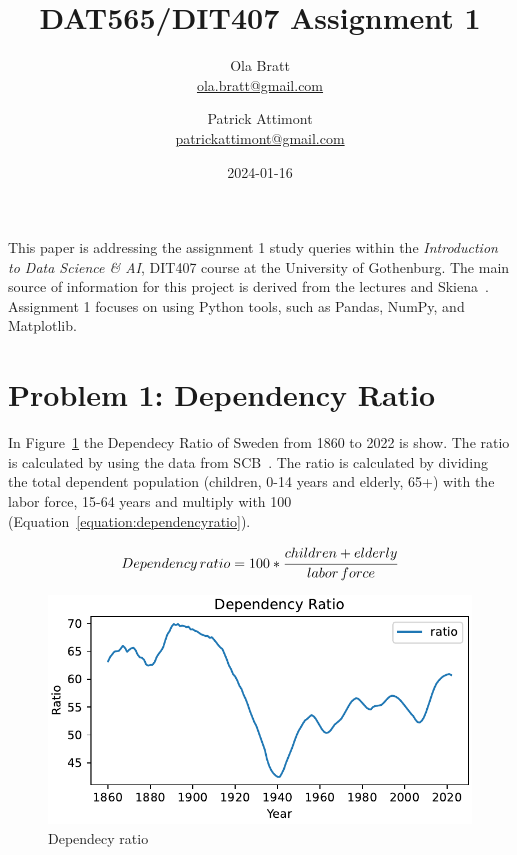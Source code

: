 \documentclass[a4paper]{article}
\begin{document}
\author{Ola Bratt \\
  \href{mailto:ola.bratt@gmail.com}{ola.bratt@gmail.com}
  \and
  Patrick Attimont \\
  \href{patrickattimont@gmail.com}{patrickattimont@gmail.com}
}

\title{DAT565/DIT407 Assignment 1}
\date{2024-01-16}

\maketitle

This paper is addressing the assignment 1 study queries within the \emph{Introduction to Data Science \& AI}, DIT407 course at 
the University of Gothenburg. The main source of information for this project
is derived from the lectures and Skiena~\cite{Skiena:2024}. Assignment 1 focuses on using Python tools, such as Pandas, NumPy, and Matplotlib. 

\section*{Problem 1: Dependency Ratio}

In Figure~\ref{fig:ratio} the Dependecy Ratio of Sweden from 1860 to 2022 is show.
The ratio is calculated by using the data from SCB~\cite{SCB:2023}. The ratio is calculated by dividing 
the total dependent population (children, 0-14 years  and elderly, 65+) with the labor force, 15-64 years and multiply with 100 (Equation~\ref{equation:dependencyratio}).


\begin{equation}
  \label{equation:dependencyratio}
  Dependency \thinspace ratio = 100 * \cfrac{ children + elderly}{labor \thinspace force}
\end{equation}

\begin{figure}[h]
  \begin{center}
    \includegraphics[width=\textwidth]{ratio.pdf}
    \caption{Dependecy ratio}
    \label{fig:ratio}
  \end{center}
\end{figure}
\end{document}
